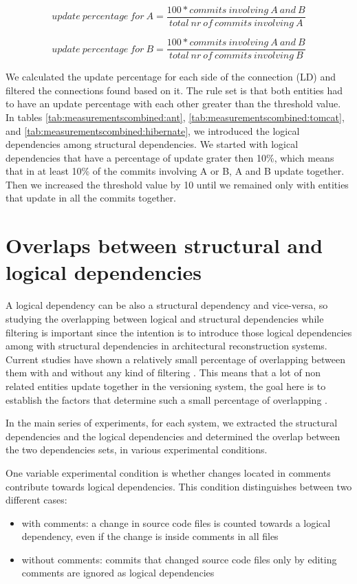\documentclass[12pt]{mitthesis}
\begin{document}
\[ update\ percentage\ for\ A 
  = \dfrac{100 * commits\ involving\ A\ and\ B}{total\ nr\ of\ commits\ involving\ A}
\]

\[ update\ percentage\ for\ B 
  = \dfrac{100 * commits\ involving\ A\ and\ B}{total\ nr\ of\ commits\ involving\ B}
\]

We calculated the update percentage for each side of the connection (LD) and filtered the connections found based on it. The rule set is that both entities had to have an update percentage with each other greater than the threshold value.
In tables \ref{tab:measurementscombined:ant}, \ref{tab:measurementscombined:tomcat}, and \ref{tab:measurementscombined:hibernate}, we introduced the logical dependencies among structural dependencies. We started with logical dependencies that have a percentage of update grater then 10\%, which means that in at least 10\% of the commits involving A or B, A and B update together. Then we increased the threshold value by 10 until we remained only with entities that update in all the commits together.




\section{Overlaps between structural and logical dependencies}
\label{sec:overlaps}
A logical dependency can be also a structural dependency and vice-versa, so studying the overlapping between logical and structural dependencies while filtering is important since the intention is to introduce those logical dependencies among with structural dependencies in architectural reconstruction systems. Current studies have shown a relatively small percentage of overlapping between them with and without any kind of filtering \cite{DBLP:journals/jss/AjienkaC17}. This means that a lot of non related entities update together in the versioning system, the goal here is to establish the factors that determine such a small percentage of overlapping \cite{enase19}.


In the main series of experiments, for each system, we extracted the structural dependencies and the logical dependencies and determined the overlap between the two dependencies sets, in various experimental conditions. 

One variable experimental condition is whether changes located in comments contribute towards logical dependencies. This condition distinguishes between two different cases: 
\begin{itemize}
	\item with comments: a change in source code files is counted towards a logical dependency, even if the change is inside comments in all files
	\item without comments: commits that changed source code files only by editing comments are ignored as logical dependencies
\end{itemize}
\end{document}
